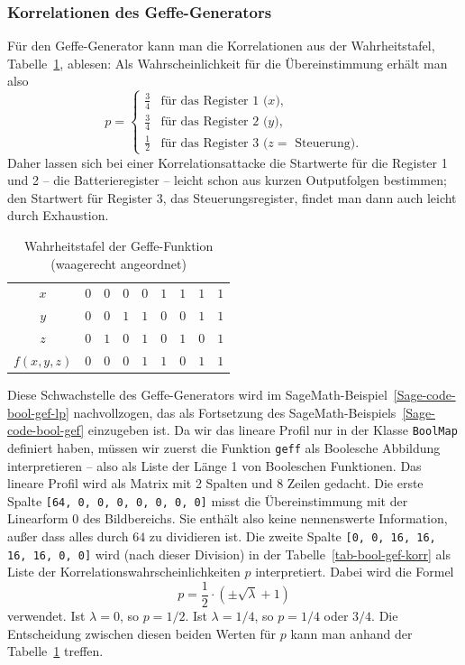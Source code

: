 \begin{refsegment}
\subsubsection*{Korrelationen des Geffe-Generators}

Für den Geffe-Generator kann man die Korrelationen aus
der Wahrheitstafel, Tabelle~\ref{tab-bool-gef-wt}, ablesen:
Als Wahrscheinlichkeit für die Übereinstimmung erhält man also
\[
   p = \begin{cases}
          \frac{3}{4} & \text{für das Register 1 ($x$),} \\
          \frac{3}{4} & \text{für das Register 2 ($y$),} \\
          \frac{1}{2} & \text{für das Register 3 ($z =$ Steuerung).}
       \end{cases}
\]
Daher lassen sich bei einer Korrelationsattacke die Startwerte für die
Register 1 und 2 -- die Batterieregister -- leicht schon aus kurzen
Outputfolgen bestimmen; den Startwert für Register 3, das Steuerungsregister,
findet man dann auch leicht durch Exhaustion.

\begin{table}
\begin{center}
  \begin{tabular}{|c|cccc|cccc|}\hline
      $x$    & $0$ & $0$ & $0$ & $0$ & $1$ & $1$ & $1$ & $1$ \\
      $y$    & $0$ & $0$ & $1$ & $1$ & $0$ & $0$ & $1$ & $1$ \\
      $z$    & $0$ & $1$ & $0$ & $1$ & $0$ & $1$ & $0$ & $1$ \\
    \hline
  $f(x,y,z)$ & $0$ & $0$ & $0$ & $1$ & $1$ & $0$ & $1$ & $1$ \\
    \hline
  \end{tabular}
\end{center}
\caption{Wahrheitstafel der Geffe-Funktion (waagerecht angeordnet)}\label{tab-bool-gef-wt}
\end{table}

Diese Schwachstelle des Geffe-Generators wird im
SageMath-Beispiel~\ref{Sage-code-bool-gef-lp} nachvollzogen, das als
Fortsetzung des SageMath-Beispiels~\ref{Sage-code-bool-gef} einzugeben ist.
Da wir das lineare Profil nur in der Klasse {\tt BoolMap} definiert
haben, müssen wir zuerst die Funktion {\tt geff} als Boolesche
Abbildung interpretieren -- also als Liste der Länge 1 von Booleschen
Funktionen. Das lineare Profil wird als Matrix
mit 2 Spalten und 8 Zeilen gedacht. Die erste Spalte
{\tt [64, 0, 0, 0, 0, 0, 0, 0]} misst die Übereinstimmung mit der
Linearform 0 des Bildbereichs. Sie enthält also keine nennenswerte
Information, außer dass alles durch $64$ zu dividieren ist. Die
zweite Spalte {\tt [0, 0, 16, 16, 16, 16, 0, 0]} wird
(nach dieser Division) in der Tabelle~\ref{tab-bool-gef-korr}
als Liste der Korrelationswahrscheinlichkeiten $p$ interpretiert.
Dabei wird die Formel
\[
     p = \frac{1}{2} \cdot (\pm \sqrt{\lambda} + 1)
\]
verwendet. Ist $\lambda = 0$, so $p = 1/2$. Ist  $\lambda = 1/4$,
so $p = 1/4$ oder $3/4$. Die Entscheidung zwischen diesen beiden
Werten für $p$ kann man anhand der Tabelle~\ref{tab-bool-gef-wt}
treffen.


\end{refsegment}
